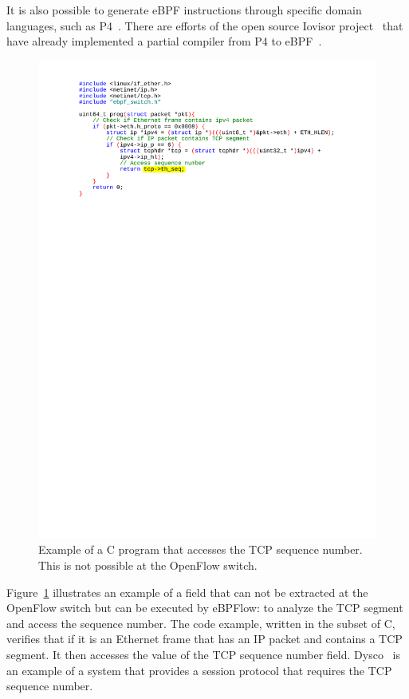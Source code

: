 It is also possible to generate eBPF instructions through specific domain languages, such as P4~\cite{Bosshart:2014:P4}.
There are efforts of the open source Iovisor project~\cite{IOvisor} that have already implemented a partial compiler from P4 to eBPF~\cite{P42EBPF2015}.

\begin{figure}[htb]
\centering
\includegraphics[width=1.\linewidth]{figures/seqnum.pdf}
\caption{Example of a C program that accesses the TCP sequence number. This is not possible at the OpenFlow switch.}
\label{fig:seqnum}
\end{figure}

Figure~\ref{fig:seqnum} illustrates an example of a field that can not be extracted at the OpenFlow switch but can be executed by eBPFlow: to analyze the TCP segment and access the sequence number.
The code example, written in the subset of C, verifies that if it is an Ethernet frame that has an IP packet and contains a TCP segment. It then accesses the value of the TCP sequence number field. Dysco~\cite{Zave:2017:DSC:3098822.3098827} is an example of a system that provides a session protocol that requires the TCP sequence number.

